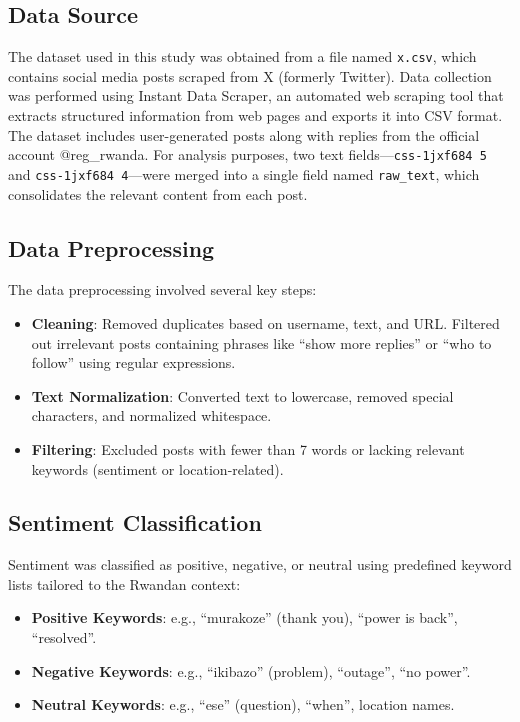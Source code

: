 \documentclass[a4paper,12pt]{article}
\begin{document}
	\subsection{Data Source}
	The dataset used in this study was obtained from a file named \texttt{x.csv}, which contains social media posts scraped from X (formerly Twitter). Data collection was performed using Instant Data Scraper, an automated web scraping tool that extracts structured information from web pages and exports it into CSV format. The dataset includes user-generated posts along with replies from the official account @reg\_rwanda. For analysis purposes, two text fields—\texttt{css-1jxf684 5} and \texttt{css-1jxf684 4}—were merged into a single field named \texttt{raw\_text}, which consolidates the relevant content from each post.
	
	\subsection{Data Preprocessing}
	The data preprocessing involved several key steps:
	\begin{itemize}
		\item \textbf{Cleaning}: Removed duplicates based on username, text, and URL. Filtered out irrelevant posts containing phrases like ``show more replies'' or ``who to follow'' using regular expressions.
		\item \textbf{Text Normalization}: Converted text to lowercase, removed special characters, and normalized whitespace.
		\item \textbf{Filtering}: Excluded posts with fewer than 7 words or lacking relevant keywords (sentiment or location-related).
	\end{itemize}
	
	\subsection{Sentiment Classification}
	Sentiment was classified as positive, negative, or neutral using predefined keyword lists tailored to the Rwandan context:
	\begin{itemize}
		\item \textbf{Positive Keywords}: e.g., ``murakoze'' (thank you), ``power is back'', ``resolved''.
		\item \textbf{Negative Keywords}: e.g., ``ikibazo'' (problem), ``outage'', ``no power''.
		\item \textbf{Neutral Keywords}: e.g., ``ese'' (question), ``when'', location names.
	\end{itemize}
	
\end{document}
